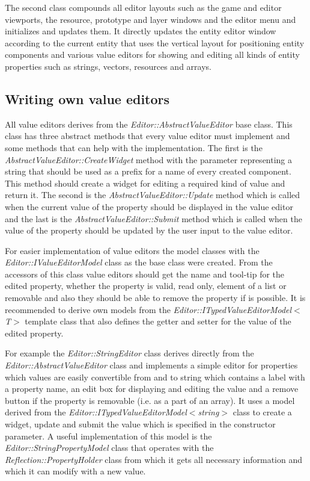 The second class compounds all editor layouts such as the game and editor viewports, the resource, prototype and layer windows and the editor menu and initializes and updates them. It directly updates the entity editor window according to the current entity that uses the vertical layout for positioning entity components and various value editors for showing and editing all kinds of entity properties such as strings, vectors, resources and arrays.

\subsection{Writing own value editors}

All value editors derives from the \emph{Editor::AbstractValueEditor} base class. This class has three abstract methods that every value editor must implement and some methods that can help with the implementation. The first is the \emph{AbstractValueEditor::CreateWidget} method with the parameter representing a string that should be used as a prefix for a name of every created component. This method should create a widget for editing a required kind of value and return it. The second is the \emph{AbstractValueEditor::Update} method which is called when the current value of the property should be displayed in the value editor and the last is the \emph{AbstractValueEditor::Submit} method which is called when the value of the property should be updated by the user input to the value editor.

For easier implementation of value editors the model classes with the \emph{Editor::IValueEditorModel} class as the base class were created. From the accessors of this class value editors should get the name and tool-tip for the edited property, whether the property is valid, read only, element of a list or removable and also they should be able to remove the property if is possible. It is recommended to derive own models from the \emph{Editor::ITypedValueEditor\-Model$<$T$>$} template class that also defines the getter and setter for the value of the edited property.

For example the \emph{Editor::StringEditor} class derives directly from the \emph{Editor::AbstractValueEditor} class and implements a simple editor for properties which values are easily convertible from and to string which contains a label with a property name, an edit box for displaying and editing the value and a remove button if the property is removable (i.e. as a part of an array). It uses a model derived from the \emph{Editor::ITypedValueEditorModel$<$string$>$} class to create a widget, update and submit the value which is specified in the constructor parameter. A useful implementation of this model is the \emph{Editor::StringPropertyModel} class that operates with the \emph{Reflection::Property\-Holder} class from which it gets all necessary information and which it can modify with a new value.

